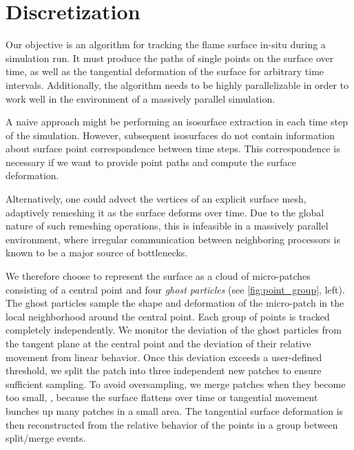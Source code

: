 \section{Discretization} %
\label{sec:fst_discretization}
%
Our objective is an algorithm for tracking the flame surface in-situ during a
simulation run.
%
It must produce the paths of single points on the surface over time, as well as
the tangential deformation of the surface for arbitrary time intervals.
%
Additionally, the algorithm needs to be highly parallelizable in order to work
well in the environment of a massively parallel simulation.
%

%
A naive approach might be performing an isosurface extraction in each time step
of the simulation.
%
However, subsequent isosurfaces do not contain information about surface point
correspondence between time steps.
%
This correspondence is necessary if we want to provide point paths and compute
the surface deformation.
%

%
Alternatively, one could advect the vertices of an explicit surface mesh,
adaptively remeshing it as the surface deforms over time.
%
Due to the global nature of such remeshing operations, this is infeasible in a
massively parallel environment, where irregular communication between
neighboring processors is known to be a major source of bottlenecks.
%

%
We therefore choose to represent the surface as a cloud of micro-patches
consisting of a central point and four \textit{ghost particles} (see
\cref{fig:point_group}, left).
%
The ghost particles sample the shape and deformation of the micro-patch in the
local neighborhood around the central point.
%
Each group of points is tracked completely independently.
%
We monitor the deviation of the ghost particles from the tangent plane at the
central point and the deviation of their relative movement from linear behavior.
%
Once this deviation exceeds a user-defined threshold, we split the patch into
three independent new patches to ensure sufficient sampling.
%
To avoid oversampling, we merge patches when they become too small, \eg, because
the surface flattens over time or tangential movement bunches up
many patches in a small area.
%
The tangential surface deformation is then reconstructed from the relative
behavior of the points in a group between split/merge events.
%

%
